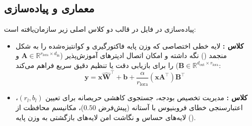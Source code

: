 \subsection{معماری و پیاده‌سازی}
پیاده‌سازی  در فایل  در قالب دو کلاس اصلی زیر سازمان‌یافته است:
\begin{itemize}
    \item \textbf{کلاس :} لایه خطی اختصاصی که وزن پایه فاکتورگیری و کوانتیزه‌شده را به شکل منجمد () نگه داشته و امکان اتصال ادپترهای آموزش‌پذیر  ($\mathbf{A} \in \mathbb{R}^{r_{\text{lora}} \times d_{\text{in}}}$ و $\mathbf{B} \in \mathbb{R}^{d_{\text{out}} \times r_{\text{lora}}}$) را برای بازیابی دقت یا تنظیم دقیق سریع فراهم می‌کند:
    \begin{equation}
    \mathbf{y} = \mathbf{x} \hat{\mathbf{W}}^\top + \mathbf{b} + \frac{\alpha}{r_{\text{lora}}} (\mathbf{x} \mathbf{A}^\top) \mathbf{B}^\top
    \end{equation}
    \item \textbf{کلاس :} مدیریت تخصیص بودجه، جستجوی کاهشی حریصانه برای تعیین $(r_l, b_l)$، اعتبارسنجی خطای فروبنیوس با آستانه  (پیش‌فرض $0.50$)، مکانیسم محافظت از لایه‌های حساس و نگاشت امن لایه‌های بازگشتی به وزن پایه ().
\end{itemize}
